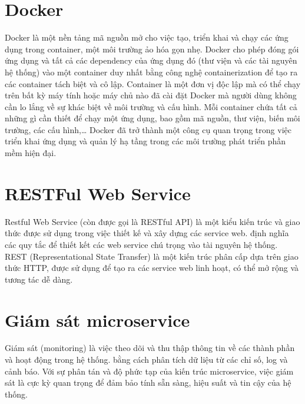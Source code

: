 \documentclass[report.tex]{subfiles}
\begin{document}
\section{Docker}

Docker là một nền tảng mã nguồn mở cho việc tạo, triển khai và chạy các ứng dụng trong container, một môi trường ảo hóa gọn nhẹ.
Docker cho phép đóng gói ứng dụng và tất cả các dependency của ứng dụng đó (thư viện và các tài nguyên hệ thống) vào một container duy nhất bằng công nghệ containerization để tạo ra các container tách biệt và cô lập.
\newline
Container là một đơn vị độc lập mà có thể chạy trên bất kỳ máy tính hoặc máy chủ nào đã cài đặt Docker mà người dùng không cần lo lắng về sự khác biệt về môi trường và cấu hình.
Mỗi container chứa tất cả những gì cần thiết để chạy một ứng dụng, bao gồm mã nguồn, thư viện, biến môi trường, các cấu hình,\dots
\newline
Docker đã trở thành một công cụ quan trọng trong việc triển khai ứng dụng và quản lý hạ tầng trong các môi trường phát triển phần mềm hiện đại.


\section{RESTFul Web Service}

Restful Web Service (còn được gọi là RESTful API) là một kiểu kiến trúc và giao thức được sử dụng trong việc thiết kế và xây dựng các service web.
định nghĩa các quy tắc để thiết kết các web service chú trọng vào tài nguyên hệ thống.
REST (Representational State Transfer) là một kiến trúc phân cấp dựa trên giao thức HTTP, được sử dụng để tạo ra các service web linh hoạt, có thể mở rộng và tương tác dễ dàng.

\section{Giám sát microservice}

Giám sát (monitoring) là việc theo dõi và thu thập thông tin về các thành phần và hoạt động trong hệ thống.
bằng cách phân tích dữ liệu từ các chỉ số, log và cảnh báo.
Với sự phân tán và độ phức tạp của kiến trúc microservice, việc giám sát là cực kỳ quan trọng để đảm bảo tính sẵn sàng, hiệu suất và tin cậy của hệ thống.
\end{document}
